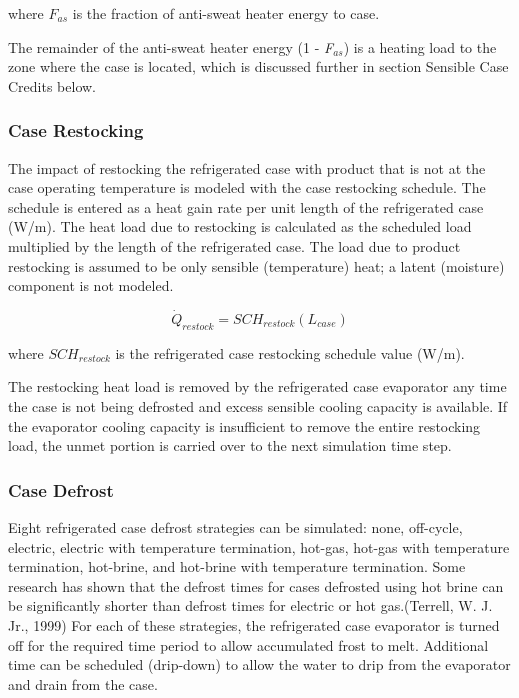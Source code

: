 where \({F_{as}}\) is the fraction of anti-sweat heater energy to case.

The remainder of the anti-sweat heater energy (1 - \emph{F\(_{as}\)}) is a heating load to the zone where the case is located, which is discussed further in section Sensible Case Credits below.

\subsubsection{Case Restocking}\label{case-restocking}

The impact of restocking the refrigerated case with product that is not at the case operating temperature is modeled with the case restocking schedule. The schedule is entered as a heat gain rate per unit length of the refrigerated case (W/m). The heat load due to restocking is calculated as the scheduled load multiplied by the length of the refrigerated case. The load due to product restocking is assumed to be only sensible (temperature) heat; a latent (moisture) component is not modeled.

\begin{equation}
{\dot Q_{restock}} = SC{H_{restock}}\left( {{L_{case}}} \right)
\end{equation}

where \(SC{H_{restock}}\) is the refrigerated case restocking schedule value (W/m).

The restocking heat load is removed by the refrigerated case evaporator any time the case is not being defrosted and excess sensible cooling capacity is available. If the evaporator cooling capacity is insufficient to remove the entire restocking load, the unmet portion is carried over to the next simulation time step.

\subsubsection{Case Defrost}\label{case-defrost}

Eight refrigerated case defrost strategies can be simulated: none, off-cycle, electric, electric with temperature termination, hot-gas, hot-gas with temperature termination, hot-brine, and hot-brine with temperature termination. Some research has shown that the defrost times for cases defrosted using hot brine can be significantly shorter than defrost times for electric or hot gas.(Terrell, W. J. Jr., 1999) For each of these strategies, the refrigerated case evaporator is turned off for the required time period to allow accumulated frost to melt. Additional time can be scheduled (drip-down) to allow the water to drip from the evaporator and drain from the case.

